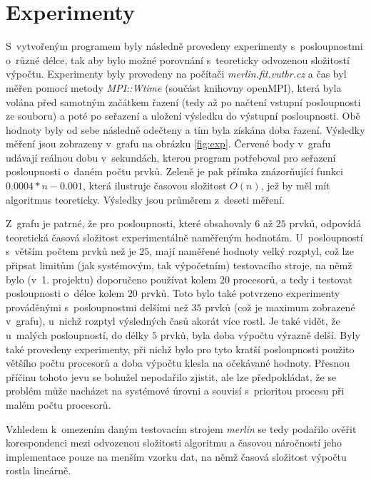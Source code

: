 \documentclass[a4paper, 12pt]{article}
\begin{document}
\section{Experimenty}
\label{sec:exprmts}

S~vytvořeným programem byly následně provedeny experimenty s~posloupnostmi o~různé délce, tak aby bylo
možné porovnání s~teoreticky odvozenou složitostí výpočtu.
Experimenty byly provedeny na počítači \emph{merlin.fit.vutbr.cz} a čas byl měřen pomocí
metody \emph{MPI::Wtime} (součást knihovny openMPI), která byla volána před samotným začátkem řazení (tedy až po načtení vstupní posloupnosti ze souboru)
a poté po seřazení a uložení výsledku do výstupní posloupnosti.
Obě hodnoty byly od sebe následně odečteny a tím byla získána doba řazení.
Výsledky měření jsou zobrazeny v~grafu na obrázku \ref{fig:exp}.
Červené body v~grafu udávají reálnou dobu v~sekundách, kterou program potřeboval pro seřazení
posloupnosti o~daném počtu prvků.
Zeleně je pak přímka znázorňující funkci $0.0004*n-0.001$, která ilustruje
časovou složitost $O(n)$, jež by měl mít algoritmus teoreticky.
Výsledky jsou průměrem z~deseti měření.

Z~grafu je patrné, že pro posloupnosti, které obsahovaly $6$ až $25$ prvků, odpovídá teoretická časová složitost
experimentálně naměřeným hodnotám.
U~posloupností s~větším počtem prvků než je $25$, mají naměřené hodnoty velký rozptyl, což lze připsat
limitům (jak systémovým, tak výpočetním) testovacího stroje, na němž bylo (v~1. projektu) doporučeno používat kolem $20$ procesorů, a tedy
i testovat posloupnosti o~délce kolem $20$ prvků.
Toto bylo také potvrzeno experimenty prováděnými s~posloupnostmi delšími než $35$ prvků (což je maximum zobrazené v~grafu),
u~nichž rozptyl výsledných časů akorát více rostl.
Je také vidět, že u~malých posloupností, do délky $5$ prvků, byla doba výpočtu výrazně delší.
Byly také provedeny experimenty, při nichž bylo pro tyto kratší posloupnosti použito většího počtu procesorů
a doba výpočtu klesla na očekávané hodnoty.
Přesnou příčinu tohoto jevu se bohužel nepodařilo zjistit, ale lze předpokládat, že se problém může nacházet na
systémové úrovni a souvisí s~prioritou procesu při malém počtu procesorů.

Vzhledem k~omezením daným testovacím strojem \emph{merlin} se tedy podařilo ověřit korespondenci mezi odvozenou složitosti
algoritmu a časovou náročností jeho implementace pouze na menším vzorku dat, na němž časová složitost výpočtu rostla lineárně.
\end{document}
